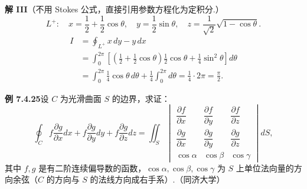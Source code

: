 \documentclass[UTF8,12pt,a4paper,fontset=fandol]{ctexart}
\begin{document}
\noindent\textbf{解 III}\quad （不用 Stokes 公式，直接引用参数方程化为定积分.）
\[
L^+:\quad x=\frac12+\frac12\cos\theta,\quad y=\frac12\sin\theta,\quad
z=\frac1{\sqrt2}\sqrt{1-\cos\theta}.
\]
\[
\begin{aligned}
I&=\oint_{L^+}x\,dy-y\,dx\\
&=\int_0^{2\pi}\left[\left(\frac12+\frac12\cos\theta\right)\frac12\cos\theta+\frac14\sin^2\theta\right]d\theta\\
&=\int_0^{2\pi}\frac14\cos\theta\,d\theta+\frac14\int_0^{2\pi}d\theta
=\frac14\cdot2\pi=\frac\pi2.
\end{aligned}
\]

\noindent\textbf{例 7.4.25}\quad 设 $C$ 为光滑曲面 $S$ 的边界，求证：
\[
\oint_C f\frac{\partial g}{\partial x}dx+f\frac{\partial g}{\partial y}dy+f\frac{\partial g}{\partial z}dz
=\iint_S
\begin{vmatrix}
\dfrac{\partial f}{\partial x} & \dfrac{\partial f}{\partial y} & \dfrac{\partial f}{\partial z}\\
\dfrac{\partial g}{\partial x} & \dfrac{\partial g}{\partial y} & \dfrac{\partial g}{\partial z}\\
\cos\alpha & \cos\beta & \cos\gamma
\end{vmatrix}dS,
\]
其中 $f,g$ 是有二阶连续偏导数的函数，$\cos\alpha,\cos\beta,\cos\gamma$ 为 $S$ 上单位法向量的方向余弦（$C$ 的方向与 $S$ 的法线方向成右手系）.（同济大学）
\end{document}
